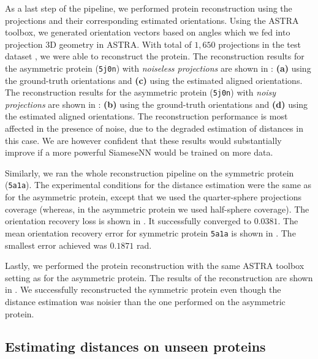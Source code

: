 
As a last step of the pipeline, we performed protein reconstruction using the projections and their corresponding estimated orientations.
Using the ASTRA toolbox, we generated orientation vectors based on angles which we fed into projection 3D geometry in ASTRA.
With total of $1,650$ projections in the test dataset , we were able to reconstruct the protein.
The reconstruction results for the asymmetric protein (\texttt{5j0n}) with \textit{noiseless projections} are shown in : \textbf{(a)} using the ground-truth orientations and \textbf{(c)} using the estimated aligned orientations.
The reconstruction results for the asymmetric protein (\texttt{5j0n}) with \textit{noisy projections} are shown in : \textbf{(b)} using the ground-truth orientations and \textbf{(d)} using the estimated aligned orientations.
The reconstruction performance is most affected in the presence of noise, due to the degraded estimation of distances in this case.
We are however confident that these results would substantially improve if a more powerful SiameseNN would be trained on more data.

Similarly, we ran the whole reconstruction pipeline on the symmetric protein (\texttt{5a1a}).
The experimental conditions for the distance estimation were the same as for the asymmetric protein, except that we used the quarter-sphere projections coverage (whereas, in the asymmetric protein we used half-sphere coverage).
The orientation recovery loss is shown in .
It successfully converged to $0.0381$.
The mean orientation recovery error for symmetric protein \texttt{5a1a} is shown in .
The smallest error achieved was $0.1871$ rad.

Lastly, we performed the protein reconstruction with the same ASTRA toolbox setting as for the asymmetric protein.
The results of the reconstruction are shown in .
We successfully reconstructed the symmetric protein even though the distance estimation was noisier than the one performed on the asymmetric protein.

\subsection{Estimating distances on unseen proteins}

